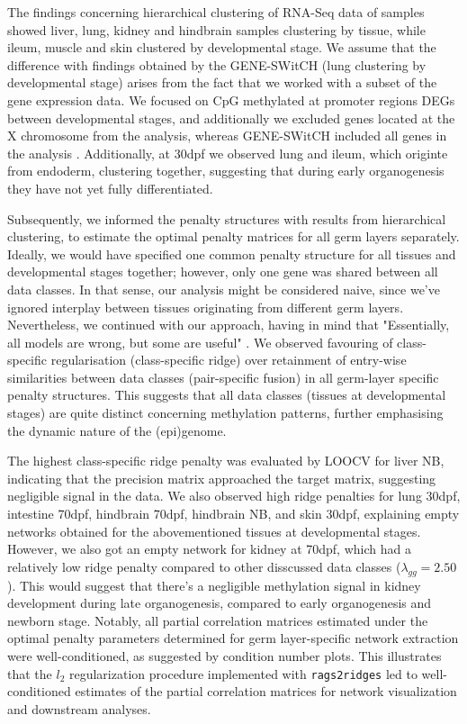 \documentclass[
	a4paper, %
	10pt, %
	unnumberedsections, %
	twoside, %
]{LTJournalArticle}
\begin{document}
The findings concerning hierarchical clustering of RNA-Seq data of 
samples showed liver, lung, kidney and hindbrain samples clustering 
by tissue, while ileum, muscle and skin clustered by developmental
stage. We assume that the difference with findings obtained by the 
GENE-SWitCH (lung clustering by developmental stage)
arises from the fact that we worked with a subset of the gene expression data.
We focused on CpG methylated at promoter regions DEGs between developmental stages,
and additionally we 
excluded genes located at the X chromosome from the analysis,
whereas GENE-SWitCH included all genes in the analysis \autocite{acloque2022a}.
Additionally, at 30dpf we observed lung and ileum, which
originte from endoderm, clustering together,
suggesting that during early organogenesis 
they have not yet fully differentiated.

Subsequently, we informed the penalty structures
with results from hierarchical clustering, to 
estimate the optimal penalty matrices for all 
germ layers separately. Ideally, we would have specified one
common penalty structure for all tissues and developmental stages together;
however, only one gene was shared between all data classes.
In that sense, our analysis might be considered naive, since we've 
ignored interplay between tissues originating from
different germ layers. Nevertheless, we continued with our approach,
having in mind that "Essentially, all models are wrong, but some are
useful" \autocite{nr1987a}.
We observed favouring of class-specific regularisation (class-specific ridge) 
over retainment of entry-wise similarities between data classes (pair-specific fusion) 
in all germ-layer specific penalty structures. This suggests that all data 
classes (tissues at developmental stages) are quite distinct 
concerning methylation patterns, 
further emphasising the dynamic nature of the (epi)genome.

The highest class-specific ridge penalty was evaluated by LOOCV for 
liver NB, indicating that the
precision matrix approached the target matrix, 
suggesting negligible signal in the data.
We also observed high ridge penalties for lung 30dpf,
intestine 70dpf, hindbrain 70dpf, hindbrain NB, 
and skin 30dpf, explaining empty networks obtained
for the abovementioned tissues at developmental stages.
However, we also got an empty network for kidney
at 70dpf, which had a relatively low ridge
penalty compared to other disscussed data classes 
($\lambda_{gg} = 2.50$). This would suggest that there's
a negligible methylation signal in kidney 
development during late organogenesis, compared
to early organogenesis and newborn stage.
Notably, all partial correlation matrices estimated under 
the optimal penalty parameters determined for germ layer-specific 
network extraction were well-conditioned, as suggested by 
condition number plots. This illustrates that the $l_2$ 
regularization procedure implemented with \texttt{rags2ridges}
led to well-conditioned estimates of the partial correlation 
matrices for network visualization and downstream analyses. 
\end{document}
